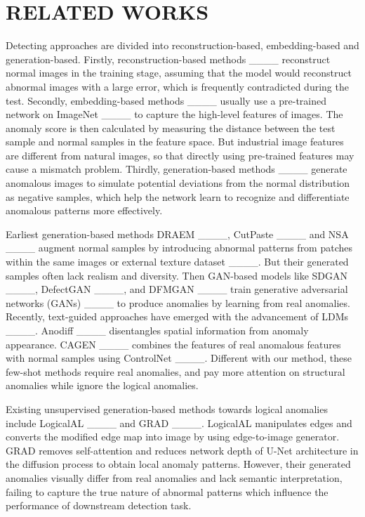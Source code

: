 \section{RELATED WORKS}
Detecting approaches are divided into reconstruction-based, embedding-based and generation-based. Firstly, reconstruction-based methods ____ reconstruct normal images in the training stage, assuming that the model would reconstruct abnormal images with a large error, which is frequently contradicted during the test. Secondly, embedding-based methods ____ usually use a pre-trained network on ImageNet ____ to capture the high-level features of images. The anomaly score is then calculated by measuring the distance between the test sample and normal samples in the feature space. But industrial image features are different from natural images, so that directly using pre-trained features may cause a mismatch problem. Thirdly, generation-based methods ____ generate anomalous images to simulate potential deviations from the normal distribution as negative samples, which help the network learn to recognize and differentiate anomalous patterns more effectively.

Earliest generation-based methods DRAEM ____, CutPaste ____ and NSA  ____ augment normal samples by introducing abnormal patterns from patches within the same images or external texture dataset ____. But their generated samples often lack realism and diversity. Then GAN-based models like SDGAN ____, DefectGAN ____, and DFMGAN ____ train generative adversarial networks (GANs) ____  to produce anomalies by learning from real anomalies. Recently, text-guided approaches have emerged with the advancement of LDMs ____. Anodiff ____ disentangles spatial information from anomaly appearance. CAGEN ____ combines the features of real anomalous features with normal samples using ControlNet ____.  Different with our method, these few-shot methods require real anomalies, and pay more attention on structural anomalies while ignore the logical anomalies.

Existing unsupervised generation-based methods towards logical anomalies include LogicalAL ____ and GRAD ____. LogicalAL manipulates edges and converts the modified edge map into image by using edge-to-image generator. GRAD removes self-attention and reduces network depth of U-Net architecture in the diffusion process to obtain local anomaly patterns. However, their generated anomalies visually differ from real anomalies and lack semantic interpretation, failing to capture the true nature of abnormal patterns which influence the performance of downstream detection task.


